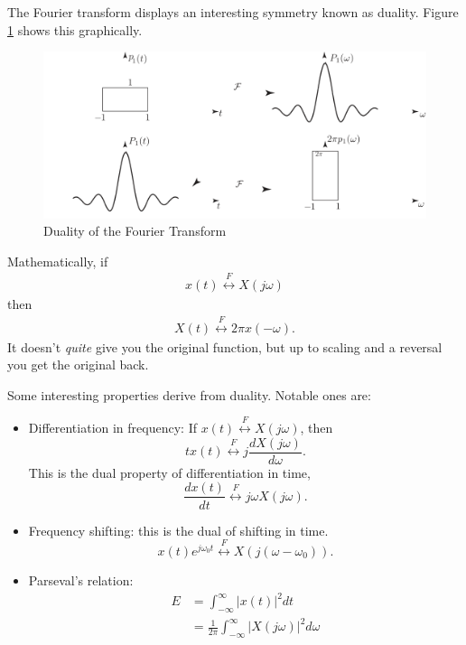 The Fourier transform displays an interesting symmetry known as duality. 
Figure \ref{fig:duality} shows this graphically. 
\begin{figure}
    \begin{center}
        \includegraphics{images/duality.png}
    \end{center}
    \caption{Duality of the Fourier Transform}
    \label{fig:duality}
\end{figure}
Mathematically, if 
\begin{align}
    x(t) \overset{F}{\leftrightarrow} X(j\omega)
\end{align}
then 
\begin{align}
    X(t) \overset{F}{\leftrightarrow} 2\pi x(-\omega).
\end{align}
It doesn't \emph{quite} give you the original function, 
but up to scaling and a reversal you get the original back. 

Some interesting properties derive from duality. Notable ones are:

\begin{itemize}
    \item Differentiation in frequency: If $x(t) \overset{F}{\leftrightarrow} X(j\omega)$, 
    then 
    \begin{equation}
        tx(t)  \overset{F}{\leftrightarrow} j\frac{dX(j\omega)}{d\omega}.
    \end{equation}
    This is the dual property of differentiation in time, 
    \begin{equation}
        \frac{dx(t)}{dt} \overset{F}{\leftrightarrow} j\omega X(j\omega).
    \end{equation}
    \item Frequency shifting: this is the dual of shifting in time. 
    \begin{equation}
        x(t)e^{j\omega_0 t} \overset{F}{\leftrightarrow} X(j(\omega-\omega_0)).
    \end{equation}
    \item Parseval's relation: 
    \begin{align}
        E &= \int_{-\infty}^{\infty} |x(t)|^2 dt \\
        &= \frac{1}{2\pi} \int_{-\infty}^{\infty} |X(j\omega)|^2 d\omega
    \end{align}
\end{itemize}

